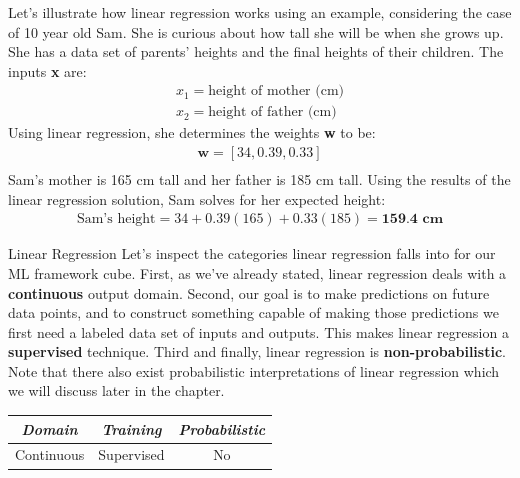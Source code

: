 
Let's illustrate how linear regression works using an example, considering the case of 10 year old Sam. She is curious about how tall she will be when she grows up. She has a data set of parents' heights and the final heights of their children. The inputs \textbf{x} are:
\begin{align*}
x_{1} = \text{height of mother (cm)} \\
x_{2} = \text{height of father (cm)}
\end{align*}
Using linear regression, she determines the weights \textbf{w} to be:
\begin{align*}
\textbf{w} = [34, 0.39, 0.33] \\
\end{align*}
Sam's mother is 165 cm tall and her father is 185 cm tall. Using the results of the linear regression solution, Sam solves for her expected height:
\begin{align*}
\text{Sam's height} = 34 + 0.39(165) + 0.33(185) = \textbf{159.4 cm}
\end{align*}

\begin{mlcube}{Linear Regression}
Let's inspect the categories linear regression falls into for our ML framework cube. First, as we've already stated, linear regression deals with a \textbf{continuous} output domain. Second, our goal is to make predictions on future data points, and to construct something capable of making those predictions we first need a labeled data set of inputs and outputs. This makes linear regression a \textbf{supervised} technique. Third and finally, linear regression is \textbf{non-probabilistic}. Note that there also exist probabilistic interpretations of linear regression which we will discuss later in the chapter.
\begin{center}
    \begin{tabular}{c|c|c}
    \textit{\textbf{Domain}} & \textit{\textbf{Training}} & \textit{\textbf{Probabilistic}} \\
    \hline
    Continuous & Supervised & No \\
    \end{tabular}
\end{center}
\end{mlcube}

